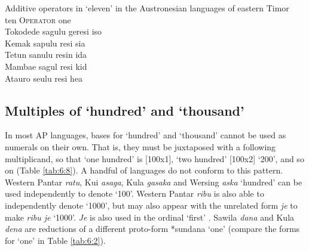\let\eachwordone=\rm
\let\eachwordtwo=\it
\let\eachwordthree=\it
\let\eachwordfour=\it
\let\eachwordfive=\it 
\let\eachwordsix\it 

\ea%
\label{ex:6:16}
\upshape
Additive operators in `eleven' in the Austronesian languages of eastern Timor\\
\gllllll {}  ten    O\textsc{perator}    one  \\
{\rm Tokodede}    sagulu  geresi    iso           \\
{\rm Kemak}     sapulu  resi    sia           \\
{\rm Tetun}    sanulu  resin    ida           \\
{\rm Mambae}    sagul    resi    kid           \\
{\rm Atauro}    se{\ng}ulu  resi    hea           \\
\z

      
\let\eachwordone=\it
\let\eachwordtwo=\rm
\let\eachwordthree=\rm
\let\eachwordfour=\rm
\let\eachwordfive=\rm 
\let\eachwordsix=\rm   







\subsection{Multiples of `hundred' and `thousand'} \label{sec:6:6.3}
In most AP languages, bases for `hundred' and `thousand' cannot be used as numerals on their own. That is, they must be juxtaposed with a following multiplicand, so that `one hundred' is [100x1], `two hundred' [100x2] `200', and so on (Table \ref{tab:6:8}). A handful of languages do not conform to this pattern. Western Pantar \textit{ratu}, Kui \textit{asaga}, Kula \textit{gasaka} and Wersing \textit{aska} `hundred' can be used independently to denote `100'. Western Pantar \textit{ribu} is also able to independently denote `1000', but may also appear with the unrelated form \textit{je} to make \textit{ribu je} `1000'. \textit{Je} is also used in the ordinal `first' \citep{KlamerSchapperCorbettTVnumeralwords}. Sawila \textit{dana} and Kula \textit{dena} are reductions of a different proto-form *sundana `one' (compare the forms for `one' in Table \ref{tab:6:2}).


